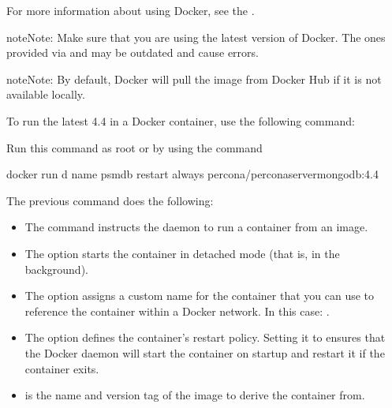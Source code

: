 \documentclass[letterpaper,10pt,english]{sphinxmanual}
\begin{document}
\sphinxAtStartPar
For more information about using Docker, see the .

\begin{sphinxadmonition}{note}{Note:}
\sphinxAtStartPar
Make sure that you are using the latest version of Docker.  The ones provided
via  and  may be outdated and cause errors.
\end{sphinxadmonition}

\begin{sphinxadmonition}{note}{Note:}
\sphinxAtStartPar
By default, Docker will pull the image from Docker Hub
if it is not available locally.
\end{sphinxadmonition}

\sphinxAtStartPar
To run the latest  4.4 in a Docker container, use the following command:

\sphinxAtStartPar
Run this command as root or by using the  command

\begin{sphinxVerbatim}[commandchars=\\\{\}]
\PYGZdl{} docker run \PYGZhy{}d \PYGZhy{}\PYGZhy{}name psmdb \PYGZhy{}\PYGZhy{}restart always 
percona/percona\PYGZhy{}server\PYGZhy{}mongodb:4.4
\end{sphinxVerbatim}

\sphinxAtStartPar
The previous command does the following:
\begin{itemize}
\item {} 
\sphinxAtStartPar
The  command instructs the  daemon
to run a container from an image.

\item {} 
\sphinxAtStartPar
The  option starts the container in detached mode
(that is, in the background).

\item {} 
\sphinxAtStartPar
The  option assigns a custom name for the container
that you can use to reference the container within a Docker network.
In this case: .

\item {} 
\sphinxAtStartPar
The  option defines the container’s restart policy.
Setting it to  ensures that the Docker daemon
will start the container on startup
and restart it if the container exits.

\item {} 
\sphinxAtStartPar
{} is the name and version tag
of the image to derive the container from.

\end{itemize}
\end{document}
